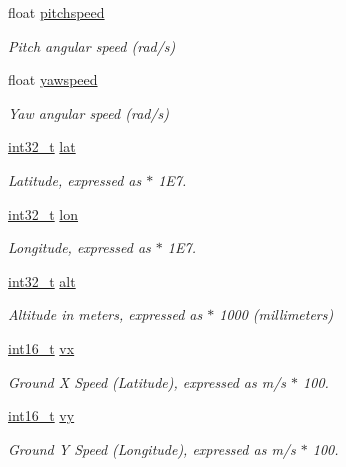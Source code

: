 \begin{DoxyCompactItemize}
float \hyperlink{struct____mavlink__hil__state__t_ad7d8b42ee6698e6f892c20146f954d5a}{pitchspeed}
\begin{DoxyCompactList}\small\item\em Pitch angular speed (rad/s) \end{DoxyCompactList}\item 
float \hyperlink{struct____mavlink__hil__state__t_a50f16fd863e535867c95fabcfef2e498}{yawspeed}
\begin{DoxyCompactList}\small\item\em Yaw angular speed (rad/s) \end{DoxyCompactList}\item 
\hyperlink{group___n_a_m_e_gafd12020da5a235dfcf0c3c748fb5baed}{int32\-\_\-t} \hyperlink{struct____mavlink__hil__state__t_afb2b29710c1a8b69503e35a72473c6d3}{lat}
\begin{DoxyCompactList}\small\item\em Latitude, expressed as $\ast$ 1\-E7. \end{DoxyCompactList}\item 
\hyperlink{group___n_a_m_e_gafd12020da5a235dfcf0c3c748fb5baed}{int32\-\_\-t} \hyperlink{struct____mavlink__hil__state__t_aeac8427298a17d090889edf71a21c6ac}{lon}
\begin{DoxyCompactList}\small\item\em Longitude, expressed as $\ast$ 1\-E7. \end{DoxyCompactList}\item 
\hyperlink{group___n_a_m_e_gafd12020da5a235dfcf0c3c748fb5baed}{int32\-\_\-t} \hyperlink{struct____mavlink__hil__state__t_a8f4ac2f2f4948df71b4abbb50d7c2f2f}{alt}
\begin{DoxyCompactList}\small\item\em Altitude in meters, expressed as $\ast$ 1000 (millimeters) \end{DoxyCompactList}\item 
\hyperlink{stdint_8h_aa343fa3b3d06292b959ffdd4c4703b06}{int16\-\_\-t} \hyperlink{struct____mavlink__hil__state__t_a8ea365258210e69427e6c02f82aa710c}{vx}
\begin{DoxyCompactList}\small\item\em Ground X Speed (Latitude), expressed as m/s $\ast$ 100. \end{DoxyCompactList}\item 
\hyperlink{stdint_8h_aa343fa3b3d06292b959ffdd4c4703b06}{int16\-\_\-t} \hyperlink{struct____mavlink__hil__state__t_a8d3234cf343035ab3f240f23fac95072}{vy}
\begin{DoxyCompactList}\small\item\em Ground Y Speed (Longitude), expressed as m/s $\ast$ 100. \end{DoxyCompactList}\item 

\end{DoxyCompactItemize}
